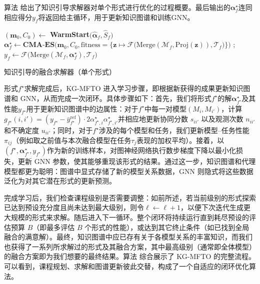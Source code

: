 \documentclass[../main.tex]{subfiles}
\begin{document}
算法 给出了知识引导求解器对单个形式进行优化的过程概要。最后输出的$\boldsymbol{\alpha}^\star_f$连同相应得分$y_f$将返回给主循环，用于更新知识图谱和训练GNN。

\begin{algorithm}[tb]
	\small
	\DontPrintSemicolon
	$(\mathbf{m}_0,C_0)\leftarrow$ \textbf{WarmStart}$\big(\hat{\boldsymbol{\alpha}}_f, \hat{S}_f\big)$
	$\displaystyle \boldsymbol{\alpha}^\star_f \leftarrow \textbf{CMA-ES}\Big(\mathbf{m}_0, C_0, \text{fitness}= \big\{\mathbf{z} \mapsto \mathcal{F}\big(\mathrm{Merge}(\mathcal{M}_f, \mathrm{Proj}(\mathbf{z})), \mathcal{T}_f\big)\big\}\Big)$ ;
	$y_f \leftarrow \mathcal{F}\Big(\mathrm{Merge}(\mathcal{M}_f, \boldsymbol{\alpha}^\star_f), \mathcal{T}_f\Big)$
	\caption{知识引导的融合求解器（单个形式）}
	\label{alg:solver}
\end{algorithm}

形式$f^\star$求解完成后，KG-MFTO 进入学习步骤，即根据新获得的成果更新知识图谱和 GNN，从而完成一次闭环。具体步骤如下：首先，我们将形式$f^\star$的解$\boldsymbol{\alpha}^\star_{f^\star}$及其性能$y_{f^\star}$用于更新知识图谱中的边属性：对于$f^\star$中每一对模型$(M_i,M_{i'})$，计算$g_{f^\star}(i,i')=(y_{f^\star}-\bar{y}^{\text{ref}}_{f^\star})\cdot 2\alpha^\star_{f^\star,i}\alpha^\star_{f^\star,i'}$并相应地更新协同分数 $s_{ii'}$ 以及观测次数 $n_{ii'}$ 和不确定度 $u_{ii'}$；同时，对于$f^\star$涉及的每个模型和任务，我们更新模型--任务性能$\pi_{ij}$（例如取之前值与本次融合模型在任务$\tau_j$表现的加权平均）。接着，以$(f^\star,\boldsymbol{\alpha}^\star_{f^\star},y_{f^\star})$作为新的训练样本，对图神经网络执行数步梯度下降以最小化损失，更新 GNN 参数，使其能够重现该形式的结果。通过这一步，知识图谱和代理模型都更为聪明：图谱中显式存储了新的模型关系数据，GNN 则隐式将这些数据泛化为对其它潜在形式的更新预测。

完成学习后，我们检查课程级别是否需要调整：如前所述，若当前级别的形式探索已达到预设充分度且尚未达到最大级别，则令$\ell \leftarrow \ell+1$，以便下次迭代生成更大规模的形式来求解。随后进入下一循环。整个闭环将持续运行直到耗尽预设的评估预算 $B$（即最多评估 $B$ 个形式的性能），或达到其它终止条件（如已找到全局融合的满意解）。最终，知识图谱中应已存有关于各模型关系的丰富知识，而我们也获得了一系列所求解过的形式及其融合方案，其中最高级别（通常即全体模型）的融合方案即为我们想要的最终结果。算法 综合展示了 KG-MFTO 的完整流程。可以看到，课程规划、求解和图谱更新彼此交替，构成了一个自适应的闭环优化算法。
\end{document}
